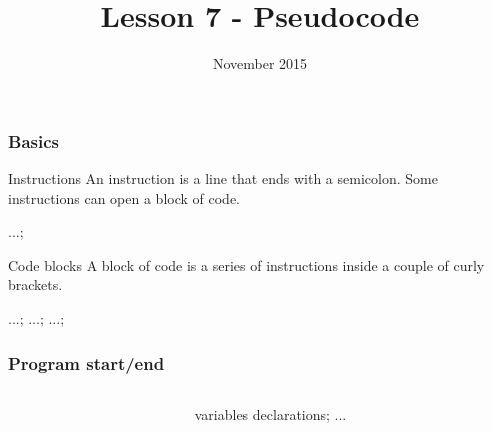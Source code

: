 


\title[Lesson 7]{\textbf{Lesson 7 - Pseudocode}}
\date[15/11/15]{ November 2015}



\begin{frame}[plain]
  \titlepage
\end{frame}

\begin{frame}[fragile]
  \frametitle{Basics}
  \begin{block}{Instructions}
    An \alert{instruction} is a line that ends with a \alert{semicolon}. Some
    instructions can open a \alert{block of code}.
    \begin{cblock}
...;
    \end{cblock}
  \end{block}
  \begin{block}{Code blocks}
    A \alert{block of code} is a series of \alert{instructions} inside a couple of
    curly brackets.
    \begin{cblock}
{
  ...;
  ...;      
  ...;
}
    \end{cblock}
  \end{block}
\end{frame}

\begin{frame}[fragile]
  \frametitle{Program start/end}
  \begin{columns}
    \begin{column}{0.3\textwidth}
    \end{column}
    \begin{column}{0.7\textwidth}
      \begin{cblock}
{
  variables declarations;
  ...
}
      \end{cblock}
    \end{column}
  \end{columns}
\end{frame}

